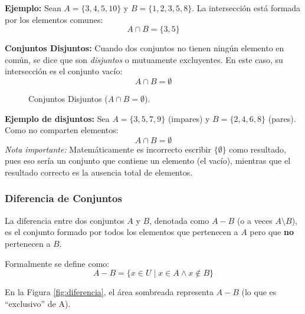 \noindent \textbf{Ejemplo:}
Sean $A=\{3,4,5,10\}$ y $B=\{1,2,3,5,8\}$.
La intersección está formada por los elementos comunes:
\[ A\cap B=\{3,5\} \]

\vspace{0.3cm}

\noindent \textbf{Conjuntos Disjuntos:}
Cuando dos conjuntos no tienen ningún elemento en común, se dice que son \textit{disjuntos} o mutuamente excluyentes. En este caso, su intersección es el conjunto vacío:
\[ A \cap B = \emptyset \]

\begin{figure}[ht]
\centering
{}
\caption{Conjuntos Disjuntos ($A \cap B = \emptyset$).}\label{fig:disjuntos}
\end{figure}

\noindent \textbf{Ejemplo de disjuntos:}
Sea $A=\{3,5,7,9\}$ (impares) y $B=\{2,4,6,8\}$ (pares).
Como no comparten elementos:
\[ A\cap B=\emptyset \]
\footnotesize
\textit{Nota importante:} Matemáticamente es incorrecto escribir $\{\emptyset\}$ como resultado, pues eso sería un conjunto que contiene un elemento (el vacío), mientras que el resultado correcto es la ausencia total de elementos.
\normalsize

\subsubsection{Diferencia de Conjuntos}

La diferencia entre dos conjuntos $A$ y $B$, denotada como $A - B$ (o a veces $A \setminus B$), es el conjunto formado por todos los elementos que pertenecen a $A$ pero que \textbf{no} pertenecen a $B$.

Formalmente se define como:
\[ A - B = \{ x \in U \mid x \in A \land x \notin B \} \]

En la Figura \ref{fig:diferencia}, el área sombreada representa $A - B$ (lo que es ``exclusivo'' de A).

